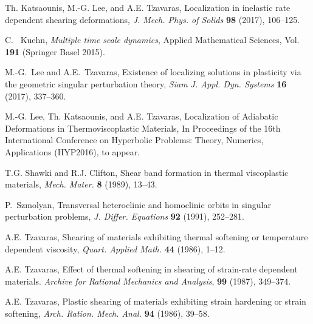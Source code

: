 \documentclass[a4paper,11pt]{article}
\theoremstyle{remark}
\begin{document}
\begin{thebibliography}{10}
{\sc Th. Katsaounis, M.-G. Lee, and A.E. Tzavaras},
Localization in inelastic rate dependent shearing deformations,
{\it J. Mech. Phys. of Solids} {\bf 98} (2017), 106--125.

{\sc C.~ Kuehn}, 
{\it Multiple time scale dynamics}, Applied Mathematical Sciences, Vol. {\bf 191} (Springer Basel 2015).

{\sc M.-G.~Lee and A.E.~Tzavaras},
Existence of localizing solutions in plasticity via the geometric singular perturbation theory,
{\it Siam J. Appl. Dyn. Systems} {\bf 16} (2017), 337--360.

{\sc M.-G. Lee, Th. Katsaounis, and A.E. Tzavaras},
Localization of Adiabatic Deformations in Thermoviscoplastic Materials, In Proceedings of the 16th International Conference on Hyperbolic Problems: Theory, Numerics, Applications (HYP2016), to appear.

%
%
%

%
%

{\sc T.G. Shawki and R.J. Clifton},
Shear band formation in thermal viscoplastic materials,
{\it Mech. Mater.}
{\bf 8 } (1989), 13--43.

{\sc P.~Szmolyan},
Transversal heteroclinic and homoclinic orbits in singular perturbation problems,
{\it J. Differ. Equations}
{\bf 92} (1991), 252--281.

{\sc A.E. Tzavaras},
Shearing of materials exhibiting thermal softening or temperature dependent viscosity,
{\em Quart.  Applied Math.} {\bf 44} (1986), 1--12.

{\sc A.E. Tzavaras},
Effect of thermal softening in shearing of strain-rate dependent materials.
{\em Archive for Rational Mechanics and Analysis}, {\bf 99} (1987), 349--374.

{\sc A.E. Tzavaras},
Plastic shearing of materials exhibiting strain hardening or strain softening,
{\it Arch. Ration. Mech. Anal.}
{\bf 94} (1986), 39--58.


\end{thebibliography}
\end{document}
